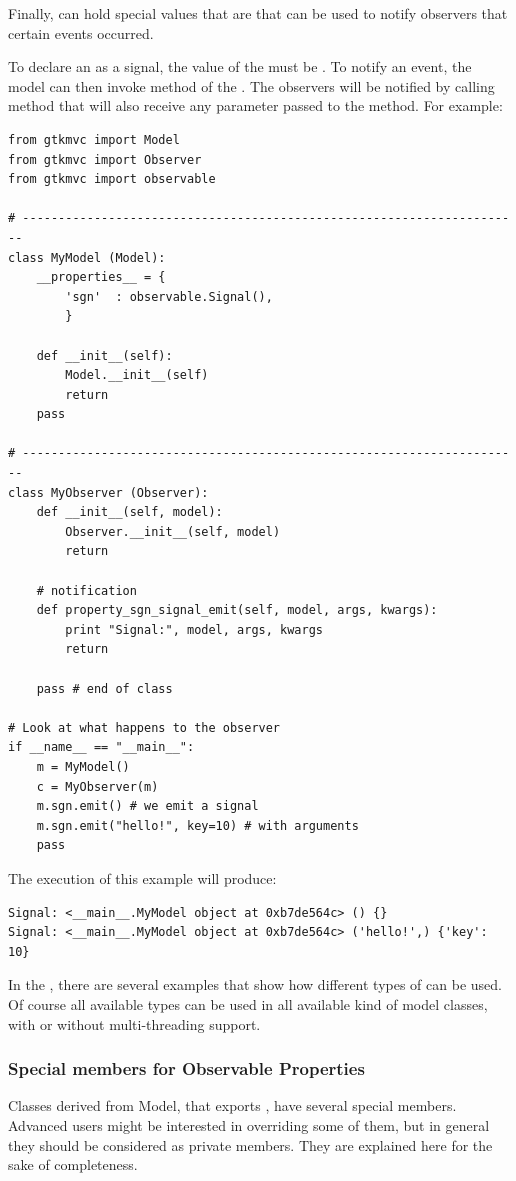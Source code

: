 \vspace{4mm}
Finally, \OP can hold special values that are  that can be
used to notify observers that certain events occurred. 

To declare an \OP as a signal, the value of the \OP must be
. To notify an event, the model
can then invoke method  of the \OP. The observers will
be notified by calling method
 that will also receive any
parameter passed to the  method. For example:

{ \codesize 
\begin{verbatim} 
from gtkmvc import Model
from gtkmvc import Observer
from gtkmvc import observable

# ----------------------------------------------------------------------
class MyModel (Model):
    __properties__ = {
        'sgn'  : observable.Signal(),
        }

    def __init__(self):
        Model.__init__(self)
        return    
    pass

# ----------------------------------------------------------------------
class MyObserver (Observer):
    def __init__(self, model):
        Observer.__init__(self, model)
        return

    # notification
    def property_sgn_signal_emit(self, model, args, kwargs):
        print "Signal:", model, args, kwargs
        return

    pass # end of class

# Look at what happens to the observer
if __name__ == "__main__":
    m = MyModel()
    c = MyObserver(m)
    m.sgn.emit() # we emit a signal
    m.sgn.emit("hello!", key=10) # with arguments
    pass
\end{verbatim}
}

The execution of this example will produce:

{ \codesize 
\begin{verbatim} 
Signal: <__main__.MyModel object at 0xb7de564c> () {}
Signal: <__main__.MyModel object at 0xb7de564c> ('hello!',) {'key': 10}
\end{verbatim}
}

In the , there are several examples that show how
different types of \OPS can be used. Of course all available types can
be used in all available kind of model classes, with or without
multi-threading support.

  
\subsubsection{Special members for Observable Properties}
Classes derived from Model, that exports \OPS, have several special
members. Advanced users might be interested in overriding some of them,
but in general they should be considered as private members. They are
explained here for the sake of completeness.

